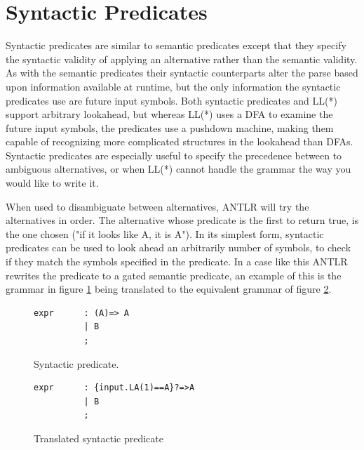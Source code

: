 \section{Syntactic Predicates}
\label{sect:antlr:syntacticPredicate}
Syntactic predicates are similar to semantic predicates except that they specify the syntactic validity of applying an alternative rather than the semantic validity. As with the semantic predicates their syntactic counterparts alter the parse based upon information available at runtime, but the only information the syntactic predicates use are future input symbols.  Both syntactic predicates and LL(*) support arbitrary lookahead, but whereas LL(*) uses a DFA to examine the future input symbols, the predicates use a pushdown machine, making them capable of recognizing more complicated structures in the lookahead than DFAs. Syntactic predicates are especially useful to specify the precedence between to ambiguous alternatives, or when LL(*) cannot handle the grammar the way you would like to write it.

When used to disambiguate between alternatives, ANTLR will try the alternatives in order. The alternative whose predicate is the first to return true, is the one chosen ("if it looks like A, it is A"). In its simplest form, syntactic predicates can be used to look ahead an arbitrarily number of symbols, to check if they match the symbols specified in the predicate. In a case like this ANTLR rewrites the predicate to a gated semantic predicate, an example of this is the grammar in figure \ref{code:syntactic} being translated to the equivalent grammar of figure \ref{code:translatedSyntactic}.

\begin{figure}[h!]
\begin{verbatim}
expr      : (A)=> A 
          | B
          ; 
\end{verbatim}
\caption{Syntactic predicate.}
\label{code:syntactic}
\end{figure}
\begin{figure}[h!]
\begin{verbatim}
expr      : {input.LA(1)==A}?=>A 
          | B
          ; 
\end{verbatim}
\caption{Translated syntactic predicate}
\label{code:translatedSyntactic}
\end{figure}

